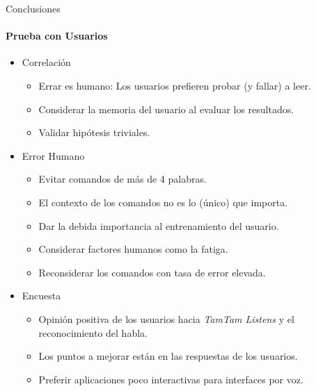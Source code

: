 \begin{frame}{Conclusiones}
\framesubtitle{Prueba con Usuarios}

\begin{itemize}
    \item Correlación
        \begin{itemize}
            \item Errar es humano: Los usuarios prefieren probar (y fallar) a leer.
            \item Considerar la memoria del usuario al evaluar los resultados.
            \item Validar hip\'otesis triviales.
        \end{itemize}
    \item Error Humano
        \begin{itemize}
            \item Evitar comandos de m\'as de 4 palabras.
            \item El contexto de los comandos no es lo (\'unico) que importa.
            \item Dar la debida importancia al entrenamiento del usuario.
            \item Considerar factores humanos como la fatiga.
            \item Reconsiderar los comandos con tasa de error elevada.
        \end{itemize}
    \item Encuesta
        \begin{itemize}
            \item Opini\'on positiva de los usuarios hacia \emph{TamTam Listens} y el reconocimiento del habla.
            \item Los puntos a mejorar est\'an en las respuestas de los usuarios.
            \item Preferir aplicaciones poco interactivas para interfaces por voz.
        \end{itemize}
    \end{itemize}

\end{frame}